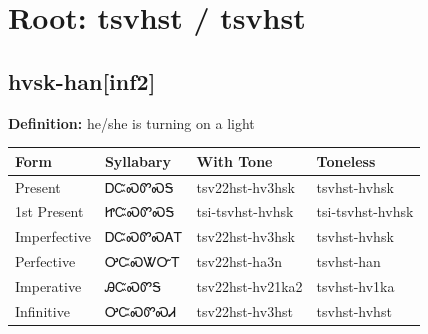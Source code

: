 \documentclass{article}%
\begin{document}
%
\normalsize%
\section*{Root: tsvhst / tsvhst}%
\subsection*{hvsk-han[inf2]}%
\textbf{Definition: }%
he/she is turning on a light%
\\[0.5em]%
\begin{tabular}{|l|l|l|l|}%
\hline%
\textbf{Form}&\textbf{Syllabary}&\textbf{With Tone}&\textbf{Toneless}\\%
\hline%
Present&ᎠᏨᏍᏛᏍᎦ&tsv22hst{-}hv3hsk&tsvhst{-}hvhsk\\%
1st Present&ᏥᏨᏍᏛᏍᎦ&tsi{-}tsvhst{-}hvhsk&tsi{-}tsvhst{-}hvhsk\\%
Imperfective&ᎠᏨᏍᏛᏍᎪᎢ&tsv22hst{-}hv3hsk&tsvhst{-}hvhsk\\%
Perfective&ᎤᏨᏍᏔᏅᎢ&tsv22hst{-}ha3n&tsvhst{-}han\\%
Imperative&ᎯᏨᏍᏛᎦ&tsv22hst{-}hv21ka2&tsvhst{-}hv1ka\\%
Infinitive&ᎤᏨᏍᏛᏍᏗ&tsv22hst{-}hv3hst&tsvhst{-}hvhst\\%
\hline%
\end{tabular}%
\\[1em]%
\end{document}
